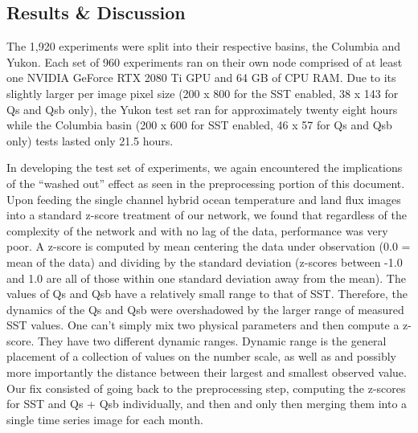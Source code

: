 \begin{refsection}
\subsection{Results \& Discussion}
The 1,920 experiments were split into their respective basins, the Columbia and Yukon. Each set of 960 experiments ran on their own node comprised of at least one NVIDIA GeForce RTX 2080 Ti GPU and 64 GB of CPU RAM. Due to its slightly larger per image pixel size (200 x 800 for the SST enabled, 38 x 143 for Qs and Qsb only), the Yukon test set ran for approximately twenty eight hours while the Columbia basin (200 x 600 for SST enabled, 46 x 57 for Qs and Qsb only) tests lasted only 21.5 hours.

In developing the test set of experiments, we again encountered the implications of the “washed out” effect as seen in the preprocessing portion of this document. Upon feeding the single channel hybrid ocean temperature and land flux images into a standard z-score treatment of our network, we found that regardless of the complexity of the network and with no lag of the data, performance was very poor. A z-score is computed by mean centering the data under observation (0.0 = mean of the data) and dividing by the standard deviation (z-scores between -1.0 and 1.0 are all of those within one standard deviation away from the mean). The values of Qs and Qsb have a relatively small range to that of SST. Therefore, the dynamics of the Qs and Qsb were overshadowed by the larger range of measured SST values. One can’t simply mix two physical parameters and then compute a z-score. They have two different dynamic ranges. Dynamic range is the general placement of a collection of values on the number scale, as well as and possibly more importantly the distance between their largest and smallest observed value. Our fix consisted of going back to the preprocessing step, computing the z-scores for SST and Qs + Qsb individually, and then and only then merging them into a single time series image for each month.


\end{refsection}
